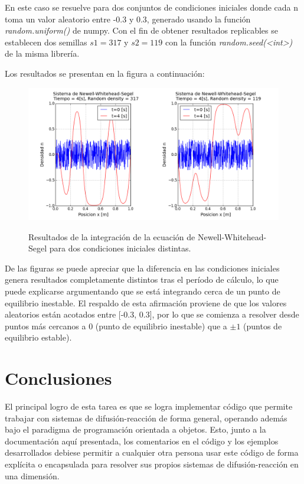 \documentclass{article}
\begin{document}
En este caso se resuelve para dos conjuntos de condiciones iniciales donde cada n toma un valor aleatorio entre -0.3 y 0.3, generado usando la función \emph{random.uniform()} de numpy. Con el fin de obtener resultados replicables se establecen dos semillas $s1 = 317$ y $s2 = 119$ con la función \emph{random.seed(<int>)} de la misma librería.

Los resultados se presentan en la figura a continuación:

\begin{figure}[ht]
  \centering
  \includegraphics[scale = 0.55]{images/resultados_p2.png}
  \label{fig:resultados_p2}
  \caption{Resultados de la integración de la ecuación de Newell-Whitehead-Segel para dos condiciones iniciales distintas.}
\end{figure}

De las figuras se puede apreciar que la diferencia en las condiciones iniciales genera resultados completamente distintos tras el período de cálculo, lo que puede explicarse argumentando que se está integrando cerca de un punto de equilibrio inestable. El respaldo de esta afirmación proviene de que los valores aleatorios están acotados entre [-0.3, 0.3], por lo que se comienza a resolver desde puntos más cercanos a $0$ (punto de equilibrio inestable) que a $\pm 1$ (puntos de equilibrio estable).

\section{Conclusiones}

El principal logro de esta tarea es que se logra implementar código que permite trabajar con sistemas de difusión-reacción de forma general, operando además bajo el paradigma de programación orientada a objetos. Esto, junto a la documentación aquí presentada, los comentarios en el código y los ejemplos desarrollados debiese permitir a cualquier otra persona usar este código de forma explícita o encapsulada para resolver sus propios sistemas de difusión-reacción en una dimensión.
\end{document}
